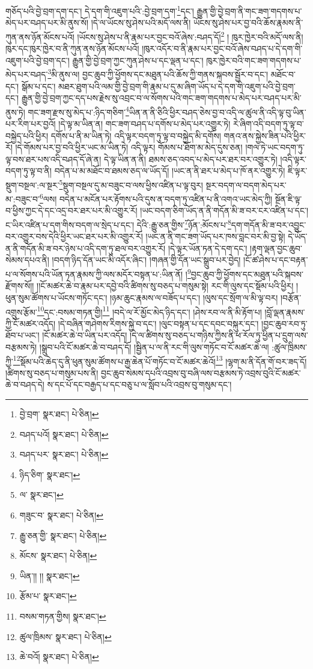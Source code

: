 གཅོད་པའི་བྱེ་བྲག་དག་དང་། དེ་དག་གི་འཇུག་པའི་:བྱེ་བྲག་དག་\footnote{བྱེ་བྲག་  སྣར་ཐང་།  པེ་ཅིན། }དང་། རྒྱུན་གྱི་བྱེ་བྲག་ནི་གང་ཟག་གདགས་པ་མེད་པར་བཤད་པར་མི་ནུས་སོ། །དེ་ལ་ཡོངས་སུ་ཤེས་པའི་མདོ་ལས་ནི། ཡོངས་སུ་ཤེས་པར་བྱ་བའི་ཆོས་རྣམས་ནི་ཀུན་ནས་ཉོན་མོངས་པའོ། །ཡོངས་སུ་ཤེས་པ་ནི་རྣམ་པར་བྱང་བའོ་ཞེས་:བཤད་དོ།\footnote{བཤད་པའོ།  སྣར་ཐང་།  པེ་ཅིན། } །
ཁུར་ཁྱེར་བའི་མདོ་ལས་ནི། ཁུར་དང་ཁུར་ཁྱེར་བ་ནི་ཀུན་ནས་ཉོན་མོངས་པའོ། །ཁུར་འདོར་བ་ནི་རྣམ་པར་བྱང་བའོ་ཞེས་བཤད་པ་དེ་དག་གི་འཇུག་པའི་བྱེ་བྲག་དང་། རྒྱུན་གྱི་བྱེ་བྲག་ཀྱང་ཀུན་ཤེས་པ་དང་ལྡན་པ་དང་། ཁུར་ཁྱེར་བའི་གང་ཟག་གདགས་པ་མེད་པར་བཤད་\footnote{བཤད་པར་  སྣར་ཐང་།  པེ་ཅིན། }མི་ནུས་ལ། བྱང་ཆུབ་ཀྱི་ཕྱོགས་དང་མཐུན་པའི་ཆོས་ཀྱི་གནས་སྐབས་སྦྱོར་བ་དང་། མཐོང་བ་དང་། སྒོམ་པ་དང་། མཐར་ཐུག་པའི་ལམ་གྱི་བྱེ་བྲག་གི་རྣམ་པ་དུ་མ་ཞིག་ཡོད་པ་དེ་དག་གི་འཇུག་པའི་བྱེ་བྲག་དང་། རྒྱུན་གྱི་བྱེ་བྲག་ཀྱང་དད་པས་རྗེས་སུ་འབྲང་བ་ལ་སོགས་པའི་གང་ཟག་གདགས་པ་མེད་པར་བཤད་པར་མི་ནུས་ཏེ། གང་ཟག་རྫས་སུ་མེད་པ་:ཉིད་གཅིག་\footnote{ཉིད་ཅིག་  སྣར་ཐང་། }ཡིན་ན་ནི་ཅིའི་ཕྱིར་བཤད་ཅེས་བྱ་བ་འདི་ལ་ཚུལ་ནི་འདི་ལྟ་བུ་ཡིན་པར་རིག་པར་བྱའོ། །དེ་ལྟ་མ་ཡིན་ན། གང་ཟག་བཤད་པ་དགོས་པ་མེད་པར་འགྱུར་ཏེ། རེ་ཞིག་འདི་བདག་ཏུ་ལྟ་བ་བསྐྱེད་པའི་ཕྱིར། དགོས་པ་ནི་མ་ཡིན་ཏེ། འདི་ལྟར་བདག་ཏུ་ལྟ་བ་བསྐྱེད་མི་དགོས། གནའ་ནས་སྐྱེས་ཟིན་པའི་ཕྱིར་རོ། །དེ་གོམས་པར་བྱ་བའི་ཕྱིར་ཡང་མ་ཡིན་ཏེ། འདི་ལྟར། གོམས་པ་ཐོག་མ་མེད་དུས་ཅན། །གལ་ཏེ་ཡང་བདག་ཏུ་ལྟ་བས་ཐར་པས་འདི་བཤད་དོ་ཞེ་ན། དེ་ལྟ་ཡིན་ན་ནི། ཐམས་ཅད་འབད་པ་མེད་པར་ཐར་བར་འགྱུར་ཏེ། །འདི་ལྟར་བདག་ཏུ་ལྟ་བ་ནི། བདེན་པ་མ་མཐོང་བ་ཐམས་ཅད་ལ་ཡོད་དོ། །ཡང་ན་ནི་ཐར་པ་མེད་པ་ཁོ་ནར་འགྱུར་ཏེ། ཇི་ལྟར་སྡུག་བསྔལ་:ལ་སྔར་\footnote{ལ་  སྣར་ཐང་། }སྡུག་བསྔལ་དུ་མ་བཟུང་བ་ལས་ཕྱིས་འཛིན་པ་ལྟ་བུར། སྔར་བདག་ལ་བདག་མེད་པར་མ་:བཟུང་བ་\footnote{གཟུང་བ་  སྣར་ཐང་།  པེ་ཅིན། }ལས། བདེན་པ་མངོན་པར་རྟོགས་པའི་དུས་ན་བདག་ཏུ་འཛིན་པ་ནི་འགའ་ཡང་མེད་ཀྱི། སྔོན་ཇི་ལྟ་བ་ཕྱིས་ཀྱང་དེ་དང་འདྲ་བར་ཐར་པར་མི་འགྱུར་རོ། །ཡང་བདག་ཅིག་ཡོད་ན་ནི་གདོན་མི་ཟ་བར་ངར་འཛིན་པ་དང་། ང་ཡིར་འཛིན་པ་དག་གིས་བདག་ལ་སྲེད་པ་དང་། དེའི་:རྒྱུ་ཅན་གྱིས་\footnote{རྒྱུ་ཅན་གྱི་  སྣར་ཐང་།  པེ་ཅིན། }ཉོན་:མོངས་པ་\footnote{མོངས་  སྣར་ཐང་།  པེ་ཅིན། }དག་གདོན་མི་ཟ་བར་འབྱུང་བར་འགྱུར་བས་དེའི་ཕྱིར་ཡང་ཐར་པར་མི་འགྱུར་རོ། །ཡང་ན་ནི་གང་ཟག་ཡོད་པར་ཁས་བླང་བར་མི་བྱ་སྟེ། དེ་ཡོད་ན་ནི་གདོན་མི་ཟ་བར་ཉེས་པ་འདི་དག་ཏུ་ཐལ་བར་འགྱུར་རོ། །དེ་ལྟར་ཡོན་ཏན་དེ་དག་དང་། །རྟག་ལྡན་བྱང་ཆུབ་སེམས་དཔའ་ནི། །བདག་ཉིད་དོན་ཡང་མི་འདོར་ཞིང་། །གཞན་གྱི་དོན་ཡང་སྒྲུབ་པར་བྱེད། །ངོ་ཚ་ཤེས་པ་དང་བརྟན་པ་ལ་སོགས་པའི་ཡོན་ཏན་རྣམས་ཀྱི་ལས་མདོར་བསྟན་པ་:ཡིན་ནོ། །\footnote{ཡིན་།། །།  སྣར་ཐང་། }བྱང་ཆུབ་ཀྱི་ཕྱོགས་དང་མཐུན་པའི་སྐབས་རྫོགས་སོ།། །།ངོ་མཚར་ཆེ་བ་རྣམ་པར་དབྱེ་བའི་ཚིགས་སུ་བཅད་པ་གསུམ་སྟེ། རང་གི་ལུས་དང་སྡོམ་པའི་ཕྱིར། །ཕུན་སུམ་ཚོགས་པ་ཡོངས་གཏོང་དང་། །ཉམ་ཆུང་རྣམས་ལ་བཟོད་པ་དང་། །ལུས་དང་སྲོག་ལ་མི་ལྟ་བར། །བརྩོན་འགྲུས་རྩོམ་\footnote{རྩོམ་པ་  སྣར་ཐང་། }དང་:བསམ་གཏན་གྱི།\footnote{བསམ་གཏན་གྱིས།  སྣར་ཐང་། } །བདེ་ལ་རོ་མྱོང་མེད་ཉིད་དང་། །ཤེས་རབ་ལ་ནི་མི་རྟོག་པ། །བློ་ལྡན་རྣམས་ཀྱི་ངོ་མཚར་འདོད། །དེ་བཞིན་གཤེགས་རིགས་སྐྱེ་བ་དང་། །ལུང་བསྟན་པ་དང་དབང་བསྐུར་དང་། །བྱང་ཆུབ་རབ་ཏུ་ཐོབ་པ་ཡང་། །ངོ་མཚར་ཆེ་བ་ཡིན་པར་འདོད། །དེ་ལ་ཚིགས་སུ་བཅད་པ་གཉིས་ཀྱིས་ནི་ཕ་རོལ་ཏུ་ཕྱིན་པ་དྲུག་ལས་བརྩམས་ཏེ། །སྒྲུབ་པའི་ངོ་མཚར་ཆེ་བ་བཤད་དོ། །སྦྱིན་པ་ལ་ནི་རང་གི་ལུས་གཏོང་བ་ངོ་མཚར་ཆེ་ལ། :ཚུལ་ཁྲིམས་ཀྱི་\footnote{ཚུལ་ཁྲིམས་  སྣར་ཐང་།  པེ་ཅིན། }སྡོམ་པའི་ཆེད་དུ་ནི་ཕུན་སུམ་ཚོགས་པ་རྒྱ་ཆེན་པོ་གཏོང་བ་ངོ་མཚར་ཆེའོ།\footnote{ཆེ་བའོ།  སྣར་ཐང་།  པེ་ཅིན། } །ལྷག་མ་ནི་དོན་གོ་བར་ཟད་དོ། །ཚིགས་སུ་བཅད་པ་གསུམ་པས་ནི། བྱང་ཆུབ་སེམས་དཔའི་འབྲས་བུ་བཞི་ལས་བརྩམས་ཏེ་འབྲས་བུའི་ངོ་མཚར་ཆེ་བ་བཤད་དེ། ས་དང་པོ་དང་བརྒྱད་པ་དང་བཅུ་པ་ལ་སློབ་པའི་འབྲས་བུ་གསུམ་དང་། 